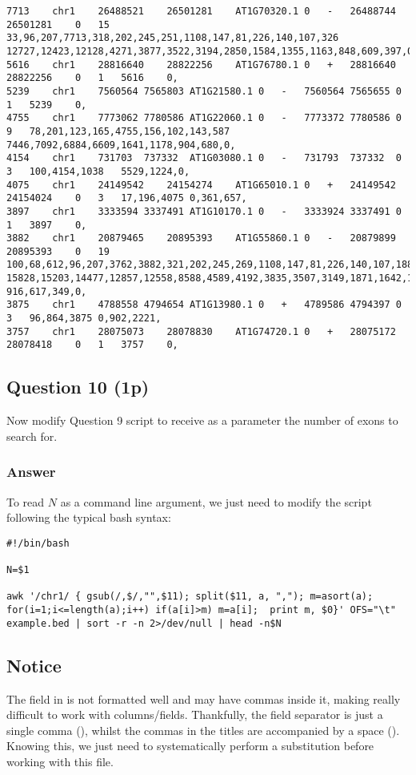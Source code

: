 \begin{lstlisting}[style=output]
7713	chr1	26488521	26501281	AT1G70320.1	0	-	26488744	26501281	0	15	33,96,207,7713,318,202,245,251,1108,147,81,226,140,107,326	12727,12423,12128,4271,3877,3522,3194,2850,1584,1355,1163,848,609,397,0,
5616	chr1	28816640	28822256	AT1G76780.1	0	+	28816640	28822256	0	1	5616	0,
5239	chr1	7560564	7565803	AT1G21580.1	0	-	7560564	7565655	0	1	5239	0,
4755	chr1	7773062	7780586	AT1G22060.1	0	-	7773372	7780586	0	9	78,201,123,165,4755,156,102,143,587	7446,7092,6884,6609,1641,1178,904,680,0,
4154	chr1	731703	737332	AT1G03080.1	0	-	731793	737332	0	3	100,4154,1038	5529,1224,0,
4075	chr1	24149542	24154274	AT1G65010.1	0	+	24149542	24154024	0	3	17,196,4075	0,361,657,
3897	chr1	3333594	3337491	AT1G10170.1	0	-	3333924	3337491	0	1	3897	0,
3882	chr1	20879465	20895393	AT1G55860.1	0	-	20879899	20895393	0	19	100,68,612,96,207,3762,3882,321,202,245,269,1108,147,81,226,140,107,188,256	15828,15203,14477,12857,12558,8588,4589,4192,3835,3507,3149,1871,1642,1454,1135, 916,617,349,0,
3875	chr1	4788558	4794654	AT1G13980.1	0	+	4789586	4794397	0	3	96,864,3875	0,902,2221,
3757	chr1	28075073	28078830	AT1G74720.1	0	+	28075172	28078418	0	1	3757	0,
\end{lstlisting}

\subsection*{Question 10 (1p)}
Now modify Question 9 script to receive as a parameter the number of exons to search for.

\subsubsection*{Answer}
To read $N$ as a command line argument, we just need to modify the script following the typical bash syntax:
\renewcommand{\lstlistingname}{Script}
\begin{lstlisting}[caption=Contents of \inline{largest-exons.sh}]
#!/bin/bash

N=$1

awk '/chr1/ { gsub(/,$/,"",$11); split($11, a, ","); m=asort(a); for(i=1;i<=length(a);i++) if(a[i]>m) m=a[i];  print m, $0}' OFS="\t" example.bed | sort -r -n 2>/dev/null | head -n$N
\end{lstlisting}
\renewcommand{\lstlistingname}{Snippet}

\subsection*{Notice}
The  field in  is not formatted well and may have commas inside it, making really difficult to work with columns/fields. Thankfully, the field separator is just a single comma (\inline{,}), whilst the commas in the titles are accompanied by a space (\inlinev{, }). Knowing this, we just need to systematically perform a  substitution before working with this file.

